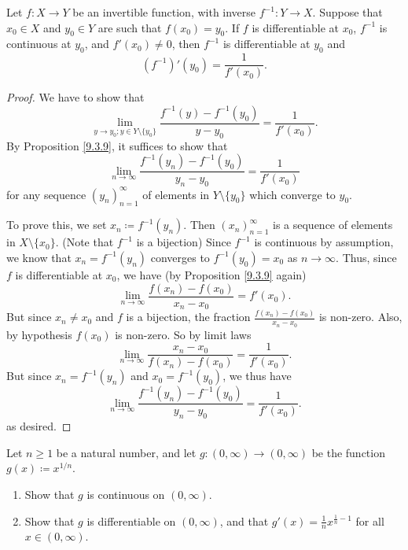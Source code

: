 \begin{theorem}\label{10.4.2}
    Let \(f : X \to Y\) be an invertible function, with inverse \(f^{-1} : Y \to X\).
    Suppose that \(x_0 \in X\) and \(y_0 \in Y\) are such that \(f(x_0) = y_0\).
    If \(f\) is differentiable at \(x_0\), \(f^{-1}\) is continuous at \(y_0\), and \(f'(x_0 ) \neq 0\), then \(f^{-1}\) is differentiable at \(y_0\) and
    \[
        (f^{-1})'(y_0) = \frac{1}{f'(x_0)}.
    \]
\end{theorem}

\begin{proof}
    We have to show that
    \[
        \lim_{y \to y_0 ; y \in Y \setminus \{y_0\}} \frac{f^{-1}(y) - f^{-1}(y_0)}{y - y_0} = \frac{1}{f'(x_0)}.
    \]
    By Proposition \ref{9.3.9}, it suffices to show that
    \[
        \lim_{n \to \infty} \frac{f^{-1}(y_n) - f^{-1}(y_0)}{y_n - y_0} = \frac{1}{f'(x_0)}
    \]
    for any sequence \((y_n)_{n = 1}^\infty\) of elements in \(Y \setminus \{y_0\}\) which converge to \(y_0\).

    To prove this, we set \(x_n \coloneqq f^{-1}(y_n)\).
    Then \((x_n)_{n = 1}^\infty\) is a sequence of elements in \(X \setminus \{x_0\}\).
    (Note that \(f^{-1}\) is a bijection)
    Since \(f^{-1}\) is continuous by assumption, we know that \(x_n = f^{-1}(y_n)\) converges to \(f^{-1}(y_0) = x_0\) as \(n \to \infty\).
    Thus, since \(f\) is differentiable at \(x_0\), we have (by Proposition \ref{9.3.9} again)
    \[
        \lim_{n \to \infty} \frac{f(x_n) - f(x_0)}{x_n - x_0} = f'(x_0).
    \]
    But since \(x_n \neq x_0\) and \(f\) is a bijection, the fraction \(\frac{f(x_n) - f(x_0)}{x_n - x_0}\) is non-zero.
    Also, by hypothesis \(f(x_0)\) is non-zero.
    So by limit laws
    \[
        \lim_{n \to \infty} \frac{x_n - x_0}{f(x_n) - f(x_0)} = \frac{1}{f'(x_0)}.
    \]
    But since \(x_n = f^{-1}(y_n)\) and \(x_0 = f^{-1}(y_0)\), we thus have
    \[
        \lim_{n \to \infty} \frac{f^{-1}(y_n) - f^{-1}(y_0)}{y_n - y_0} = \frac{1}{f'(x_0)}.
    \]
    as desired.
\end{proof}

\exercisesection

\begin{exercise}\label{ex 10.4.1}
    Let \(n \geq 1\) be a natural number, and let \(g : (0, \infty) \to (0, \infty)\) be the function \(g(x) \coloneqq x^{1 / n}\).
    \begin{enumerate}
        \item Show that \(g\) is continuous on \((0, \infty)\).
        \item Show that \(g\) is differentiable on \((0, \infty)\), and that \(g'(x) = \frac{1}{n} x^{\frac{1}{n} - 1}\) for all \(x \in (0, \infty)\).
    \end{enumerate}
\end{exercise}

